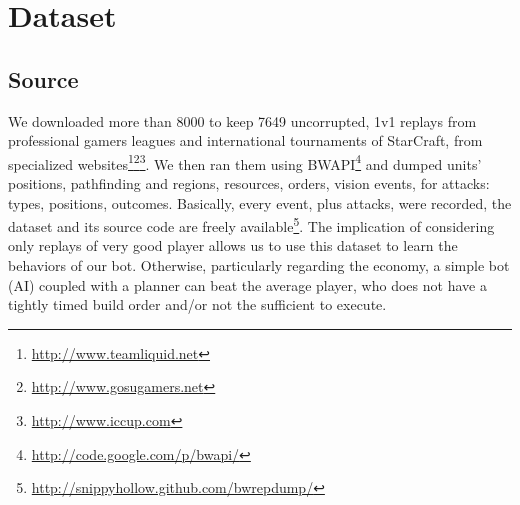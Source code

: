 \section{Dataset}
\label{sec:dataset}
\subsection{Source}
We downloaded more than 8000  to keep 7649 uncorrupted, 1v1 replays from professional gamers leagues and international tournaments of StarCraft, from specialized websites\footnote{\url{http://www.teamliquid.net}}\footnote{\url{http://www.gosugamers.net}}\footnote{\url{http://www.iccup.com}}. We then ran them using BWAPI\footnote{\url{http://code.google.com/p/bwapi/}} and dumped units' positions, pathfinding and regions, resources, orders, vision events, for attacks: types, positions, outcomes. Basically, every  event, plus attacks, were recorded, the dataset and its source code are freely available\footnote{\url{http://snippyhollow.github.com/bwrepdump/}}. 
The implication of considering only replays of very good player allows us to use this dataset to learn the behaviors of our bot. Otherwise, particularly regarding the economy, a simple bot (AI) coupled with a planner can beat the average player, who does not have a tightly timed build order and/or not the sufficient  to execute. %


